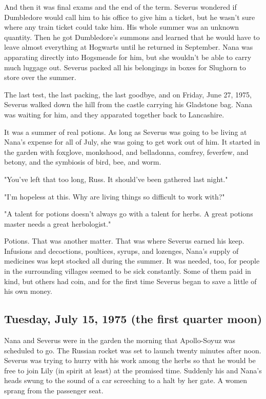 And then it was final exams and the end of the term. Severus wondered if Dumbledore would call him to his office to give him a ticket, but he wasn't sure where any train ticket could take him. His whole summer was an unknown quantity. Then he got Dumbledore's summons and learned that he would have to leave almost everything at Hogwarts until he returned in September. Nana was apparating directly into Hogsmeade for him, but she wouldn't be able to carry much luggage out. Severus packed all his belongings in boxes for Slughorn to store over the summer.

The last test, the last packing, the last goodbye, and on Friday, June 27, 1975, Severus walked down the hill from the castle carrying his Gladstone bag. Nana was waiting for him, and they apparated together back to Lancashire.

It was a summer of real potions. As long as Severus was going to be living at Nana's expense for all of July, she was going to get work out of him. It started in the garden with foxglove, monkshood, and belladonna, comfrey, feverfew, and betony, and the symbiosis of bird, bee, and worm.

"You've left that too long, Russ. It should've been gathered last night."

"I'm hopeless at this. Why are living things so difficult to work with?"

"A talent for potions doesn't always go with a talent for herbs. A great potions master needs a great herbologist."

Potions. That was another matter. That was where Severus earned his keep. Infusions and decoctions, poultices, syrups, and lozenges, Nana's supply of medicines was kept stocked all during the summer. It was needed, too, for people in the surrounding villages seemed to be sick constantly. Some of them paid in kind, but others had coin, and for the first time Severus began to save a little of his own money.

\subsection{Tuesday, July 15, 1975 (the first quarter moon)}

Nana and Severus were in the garden the morning that Apollo-Soyuz was scheduled to go. The Russian rocket was set to launch twenty minutes after noon. Severus was trying to hurry with his work among the herbs so that he would be free to join Lily (in spirit at least) at the promised time. Suddenly his and Nana's heads swung to the sound of a car screeching to a halt by her gate. A women sprang from the passenger seat.

